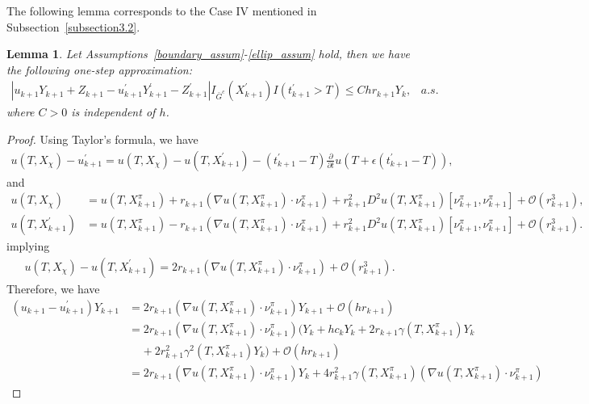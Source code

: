 \documentclass{article}
\newtheorem{lemma}[theorem]{Lemma}
\theoremstyle{definition}
\numberwithin{equation}{section}
\begin{document}
The following lemma corresponds to the Case IV mentioned in Subsection~\ref{subsection3.2}.
\begin{lemma}\label{sticky_lemma_4.5}
Let Assumptions~\ref{boundary_assum}-\ref{ellip_assum} hold, then we have the following one-step approximation:
\begin{align*}
|u_{k+1}Y_{k+1} + Z_{k+1} - u_{k+1}^{'}Y_{k+1}^{'} - Z_{k+1}^{'}   |I_{\bar{G}^{c}}(X_{k+1}^{'})I(t^{'}_{k+1} > T) \leq Chr_{k+1}Y_{k},\;\;\; a.s. 
\end{align*}
where $C > 0$ is independent of $h$. %

\end{lemma}
\begin{proof}
Using Taylor's formula, we have
\begin{align}
    u(T, X_{\chi}) - u_{k+1}^{'} = u(T, X_{\chi}) - u(T, X^{'}_{k+1}) - (t^{'}_{k+1} - T) \frac{\partial}{\partial t} u(T + \epsilon (t_{k+1}^{'} - T)),
\end{align}
and
\begin{align*}
    u(T, X_{\chi}) &= u(T, X^{\pi}_{k+1}) + r_{k+1} (\nabla u(T, X^{\pi}_{k+1}) \cdot \nu^{\pi}_{k+1}) + r^{2}_{k+1} D^2 u(T, X^{\pi}_{k+1})[\nu^{\pi}_{k+1}, \nu^{\pi}_{k+1}] + \mathcal{O}(r_{k+1}^{3}), \\
    u(T, X_{k+1}^{'}) &= u(T, X^{\pi}_{k+1}) - r_{k+1} (\nabla u(T, X^{\pi}_{k+1}) \cdot \nu^{\pi}_{k+1}) + r^{2}_{k+1} D^2 u(T, X^{\pi}_{k+1})[\nu^{\pi}_{k+1}, \nu^{\pi}_{k+1}]+ \mathcal{O}(r_{k+1}^{3}).
\end{align*}
implying
\begin{align}
    u(T, X_{\chi}) - u(T, X^{'}_{k+1}) = 2r_{k+1}(\nabla u(T, X^{\pi}_{k+1}) \cdot  \nu^{\pi}_{k+1}) + \mathcal{O}(r_{k+1}^{3}).
\end{align}
Therefore, we have
\begin{align}
   (u_{k+1} - u_{k+1}^{'})Y_{k+1} &=  2r_{k+1}(\nabla u(T, X^{\pi}_{k+1}) \cdot  \nu^{\pi}_{k+1})Y_{k+1} + \mathcal{O}(hr_{k+1}) \nonumber \\  &
   = 2r_{k+1}(\nabla u(T, X^{\pi}_{k+1}) \cdot  \nu^{\pi}_{k+1})\big(Y_{k} + h c_k Y_k + 2 r_{k+1}\gamma(T, X^{\pi}_{k+1})Y_k \nonumber\\  &  \;\;\;\; + 2 r_{k+1}^2\gamma^2(T, X^{\pi}_{k+1})Y_k\big) + \mathcal{O}(hr_{k+1})
  \nonumber  \\  &
   = 2r_{k+1}(\nabla u(T, X^{\pi}_{k+1}) \cdot  \nu^{\pi}_{k+1})Y_{k}
   + 4r_{k+1}^2\gamma(T, X^{\pi}_{k+1})(\nabla u(T, X^{\pi}_{k+1}) \cdot \nu^{\pi}_{k+1}) \nonumber

\end{align}
\end{proof}
\end{document}
